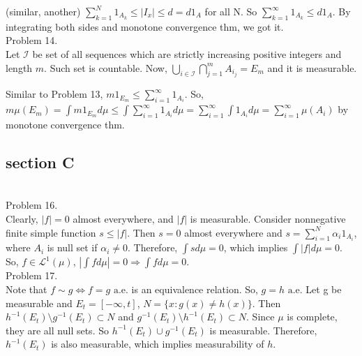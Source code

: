 \documentclass{amsart}
\begin{document}
(similar, another) $\sum_{k=1}^N 1_{A_k} \leq \left | I_x \right | \leq d = d 1_A$ for all N.
So $\sum_{k=1}^{\infty} 1_{A_k} \leq d1_A$.
By integrating both sides and monotone convergence thm, we got it.\\

Problem 14. \\

Let $\mathcal{I}$ be set of all sequences which are strictly increasing positive integers and length $m$.
Such set is countable. Now, $\bigcup_{i \in \mathcal{I}} \bigcap_{j=1}^m A_{i_j} = E_m$ and it is measurable.

Similar to Problem 13, $m 1_{E_m} \leq \sum_{i=1}^{\infty}1_{A_i}$.
So, $m \mu(E_m) = \int m 1_{E_m} d\mu \leq \int \sum_{i=1}^{\infty}1_{A_i} d\mu = \sum_{i=1}^{\infty} \int 1_{A_i} d\mu = \sum_{i=1}^{\infty}\mu(A_i)$ by monotone convergence thm.

\subsection*{section C} \hfill \\

Problem 16. \\

Clearly, $ \lvert f \rvert = 0$ almost everywhere, and $\lvert f \rvert$ is measurable.
Consider nonnegative finite simple function $s \leq \lvert f \rvert$. Then $s=0$ almost everywhere
and $s = \sum_{i=1}^N \alpha_i 1_{A_i}$, where $A_i$ is null set if $\alpha_i \ne 0$.
Therefore, $\int s d\mu = 0$, which implies $\int \lvert f \rvert d\mu = 0$.
So, $f \in \mathcal{L}^1(\mu)$, $\left | \int f d \mu \right | =0 \Rightarrow \int f d \mu = 0$.\\

Problem 17. \\

Note that $f \sim g \Leftrightarrow f = g\text{ a.e.}$ is an equivalence relation.
So, $g = h \text{ a.e}$.
Let g be measurable and $E_t = \left [ -\infty, t \right]$, $N = \{ x : g(x) \ne h(x)\}$.
Then $h^{-1}(E_t) \setminus g^{-1}(E_t) \subset N$ and $g^{-1}(E_t) \setminus h^{-1}(E_t) \subset N$.
Since $\mu$ is complete, they are all null sets. So $h^{-1}(E_t) \cup g^{-1}(E_t)$ is measurable.
Therefore, $h^{-1}(E_t)$ is also measurable, which implies measurability of $h$.\\
\end{document}

